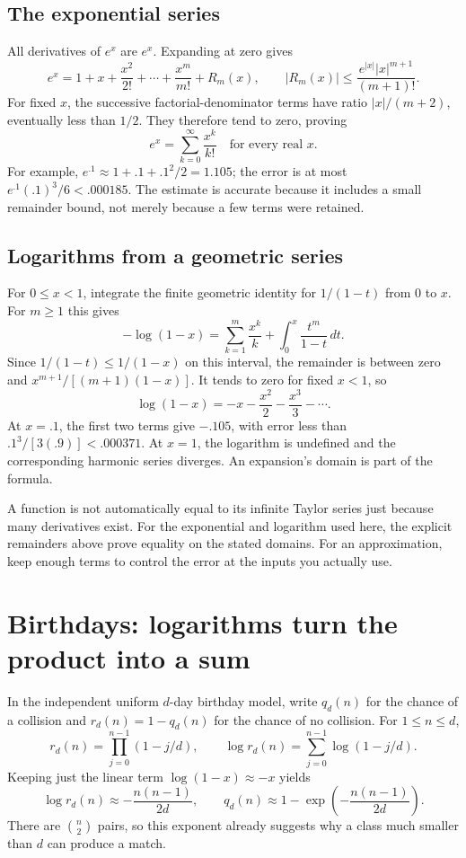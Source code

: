 \subsection*{The exponential series}
All derivatives of $e^x$ are $e^x$. Expanding at zero gives
\[
 e^x=1+x+\frac{x^2}{2!}+\cdots+\frac{x^m}{m!}+R_m(x),
 \qquad |R_m(x)|\le\frac{e^{|x|}|x|^{m+1}}{(m+1)!}.
\]
For fixed $x$, the successive factorial-denominator terms have ratio
$|x|/(m+2)$, eventually less than $1/2$. They therefore tend to zero,
proving
\[
 e^x=\sum_{k=0}^{\infty}\frac{x^k}{k!}\quad\text{for every real }x.
\]
For example, $e^{.1}\approx1+.1+.1^2/2=1.105$; the error is at most
$e^{.1}(.1)^3/6<.000185$. The estimate is accurate because it includes
a small remainder bound, not merely because a few terms were retained.

\subsection*{Logarithms from a geometric series}
For $0\le x<1$, integrate the finite geometric identity for $1/(1-t)$
from $0$ to $x$. For $m\ge1$ this gives
\[
 -\log(1-x)=\sum_{k=1}^m\frac{x^k}{k}
       +\int_0^x\frac{t^m}{1-t}\,dt.
\]
Since $1/(1-t)\le1/(1-x)$ on this interval, the remainder is between
zero and $x^{m+1}/[(m+1)(1-x)]$. It tends to zero for fixed $x<1$,
so
\[
 \log(1-x)=-x-\frac{x^2}{2}-\frac{x^3}{3}-\cdots.
\]
At $x=.1$, the first two terms give $-.105$, with error less than
$.1^3/[3(.9)]<.000371$. At $x=1$, the logarithm is undefined and
the corresponding harmonic series diverges. An expansion's domain
is part of the formula.

\begin{warningbox}
A function is not automatically equal to its infinite Taylor series
just because many derivatives exist. For the exponential and logarithm
used here, the explicit remainders above prove equality on the stated
domains. For an approximation, keep enough terms to control the error
at the inputs you actually use.
\end{warningbox}

\section{Birthdays: logarithms turn the product into a sum}
\label{sec:calc-birthdays}

In the independent uniform $d$-day birthday model, write $q_d(n)$ for
the chance of a collision and $r_d(n)=1-q_d(n)$ for the chance of no
collision. For $1\le n\le d$,
\[
 r_d(n)=\prod_{j=0}^{n-1}(1-j/d),\qquad
 \log r_d(n)=\sum_{j=0}^{n-1}\log(1-j/d).
\]
Keeping just the linear term $\log(1-x)\approx-x$ yields
\[
 \log r_d(n)\approx-\frac{n(n-1)}{2d},\qquad
 q_d(n)\approx1-\exp\!\left(-\frac{n(n-1)}{2d}\right).
\]
There are $\binom n2$ pairs, so this exponent already suggests why a
class much smaller than $d$ can produce a match.

